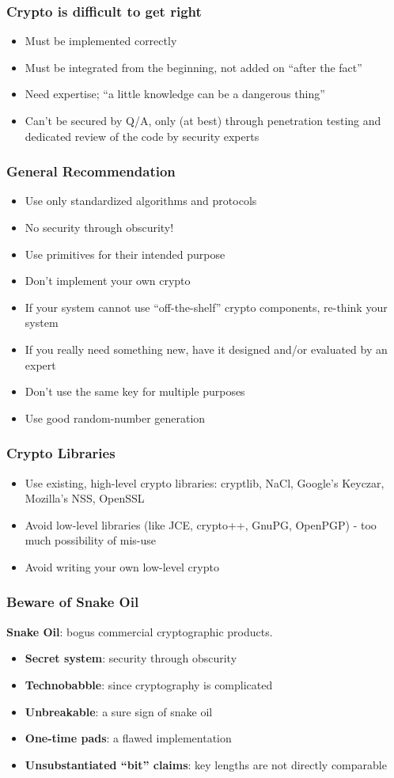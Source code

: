 \begin{frame}\frametitle{Crypto is difficult to get right}
\begin{itemize}
\item Must be implemented correctly
\item Must be integrated from the beginning, not added on ``after the fact''
\item Need expertise; ``a little knowledge can be a dangerous thing''
\item Can't be secured by Q/A, only (at best) through penetration testing and dedicated review of the code by security experts
\end{itemize}
\end{frame}
\begin{frame}\frametitle{General Recommendation}
\begin{itemize}
\item Use only standardized algorithms and protocols
\item No security through obscurity!
\item Use primitives for their intended purpose
\item Don't implement your own crypto
\item If your system cannot use ``off-the-shelf'' crypto components, re-think your system
\item If you really need something new, have it designed and/or evaluated by an expert
\item Don't use the same key for multiple purposes
\item Use good random-number generation
\end{itemize}
\end{frame}
\begin{frame}\frametitle{Crypto Libraries}
\begin{itemize}
\item Use existing, high-level crypto libraries: 
cryptlib, NaCl, Google's Keyczar, Mozilla's NSS, OpenSSL 
\item Avoid low-level libraries (like JCE, crypto++, GnuPG, OpenPGP) - too much possibility of mis-use
\item Avoid writing your own low-level crypto
\end{itemize}
\end{frame}
\begin{frame}\frametitle{Beware of Snake Oil}
\textbf{Snake Oil}: bogus commercial cryptographic products.
\begin{itemize}
\item \textbf{Secret system}: security through obscurity
\item \textbf{Technobabble}: since cryptography is complicated
\item \textbf{Unbreakable}: a sure sign of snake oil
\item \textbf{One-time pads}: a flawed implementation
\item \textbf{Unsubstantiated ``bit'' claims}: key lengths are not directly comparable
\end{itemize}
\end{frame}
